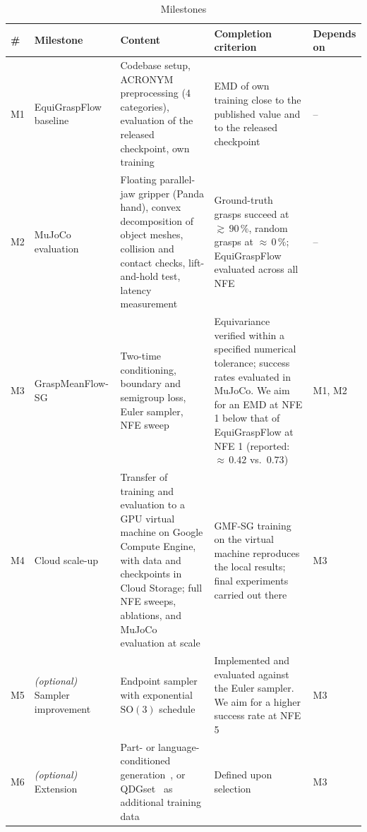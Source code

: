 \documentclass[conference]{IEEEtran}
\newcommand{\SO}{\mathrm{SO}(3)}
\begin{document}
\nocite{lipman2023flowmatching,chen2024riemannianfm}
\begin{table}[!t]
  \caption{Milestones}
  \label{tab:milestones}
  \centering
  \footnotesize
  \begin{tabularx}{\textwidth}{@{}l p{2.6cm} X X l@{}}
    \toprule
    \# & Milestone & Content & Completion criterion & Depends on \\
    \midrule
    M1 & EquiGraspFlow baseline & Codebase setup, ACRONYM preprocessing (4 categories), evaluation of the
      released checkpoint, own training & EMD of own training close to the published value and to the released
      checkpoint & -- \\
    M2 & MuJoCo evaluation & Floating parallel-jaw gripper (Panda hand), convex decomposition of object meshes,
      collision and contact checks, lift-and-hold test, latency measurement & Ground-truth grasps succeed at
      ${\gtrsim}\,90\,\%$, random grasps at ${\approx}\,0\,\%$; EquiGraspFlow evaluated across all NFE & -- \\
    M3 & GraspMeanFlow-SG & Two-time conditioning, boundary and semigroup loss, Euler sampler, NFE sweep &
      Equivariance verified within a specified numerical tolerance; success rates evaluated in MuJoCo. We aim for an
      EMD at NFE 1 below that of EquiGraspFlow at NFE 1 (reported: ${\approx}\,0.42$ vs.\ $0.73$) & M1, M2 \\
    M4 & Cloud scale-up & Transfer of training and evaluation to a GPU virtual machine on Google Compute Engine,
      with data and checkpoints in Cloud Storage; full NFE sweeps, ablations, and MuJoCo evaluation at scale &
      GMF-SG training on the virtual machine reproduces the local results; final experiments carried out there &
      M3 \\
    M5 & \textit{(optional)} Sampler improvement & Endpoint sampler with exponential $\SO$
      schedule~\cite{kwon2026graspmeanflow} & Implemented and evaluated against the Euler sampler. We aim for a higher success rate at NFE 5 & M3 \\
    M6 & \textit{(optional)} Extension & Part- or language-conditioned
      generation~\cite{lundell2023constrained}, or QDGset~\cite{huber2024qdgset} as additional training data &
      Defined upon selection & M3 \\
    \bottomrule
  \end{tabularx}
\end{table}
\end{document}
